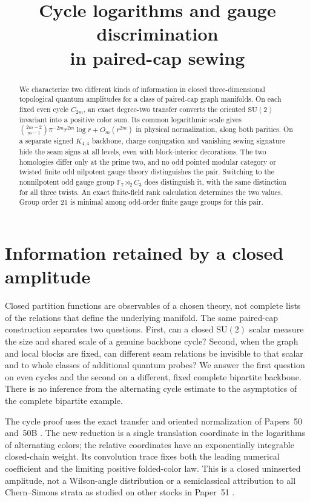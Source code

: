 \documentclass[11pt,a4paper]{article}
\title{Cycle logarithms and gauge discrimination\\in paired-cap sewing}
\author{}
\date{}
\theoremstyle{remark}\newtheorem{remark}[theorem]{Remark}
\newcommand{\SU}{\mathrm{SU}}
\newcommand{\FF}{\mathbb F}
\begin{document}
\maketitle
\begin{abstract}
We characterize two different kinds of information in closed
three-dimensional topological quantum amplitudes for a class of
paired-cap graph manifolds. On each fixed even cycle \(C_{2m}\), an exact
degree-two transfer converts the oriented \(\SU(2)\) invariant into a
positive color sum. Its common logarithmic scale gives
\(\binom{2m-2}{m-1}\pi^{-2m}r^{2m}\log r+O_m(r^{2m})\) in physical
normalization, along both parities. On a separate signed \(K_{4,4}\)
backbone, charge conjugation and vanishing sewing signature hide the seam
signs at all levels, even with block-interior decorations. The two
homologies differ only at the prime two, and no odd pointed modular
category or twisted finite odd nilpotent gauge theory distinguishes the
pair. Switching to the nonnilpotent odd gauge group
\(\FF_7\rtimes_{2}C_3\) does distinguish it, with the same distinction
for all three twists. An exact finite-field rank calculation determines
the two values. Group order \(21\) is minimal among odd-order finite
gauge groups for this pair.
\end{abstract}

\section{Information retained by a closed amplitude}

Closed partition functions are observables of a chosen theory, not
complete lists of the relations that define the underlying manifold.
The same paired-cap construction separates two questions. First, can a
closed \(\SU(2)\) scalar measure the size and shared scale of a genuine
backbone cycle? Second, when the graph and local blocks are fixed, can
different seam relations be invisible to that scalar and to whole
classes of additional quantum probes? We answer the first question on
even cycles and the second on a different, fixed complete bipartite
backbone. There is no inference from the alternating cycle estimate to
the asymptotics of the complete bipartite example.

The cycle proof uses the exact transfer and oriented normalization of
Papers~50 and~50B \cite{P50,P50B}. The new reduction is a single
translation coordinate in the logarithms of alternating colors; the
relative coordinates have an exponentially integrable closed-chain
weight. Its convolution trace fixes both the leading numerical
coefficient and the limiting positive folded-color law. This is a
closed uninserted amplitude, not a Wilson-angle distribution or a
semiclassical attribution to all Chern--Simons strata as studied on
other stocks in Paper~51 \cite{P51}.
\end{document}
